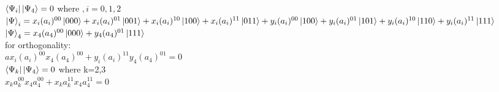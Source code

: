\documentclass[a4paper,12pt]{article}
\begin{document}
\leavevmode\\
\newline \\
$\bra{\Psi_{i}}\ket{\Psi_{4}}=0 $       where     $ ,i=0,1,2   $ 
\leavevmode
\newline  \\
$\ket{\Psi}_{i}=x_{i}(a_{i})^{00}\ket{000}+x_{i}(a_{i})^{01}\ket{001}+x_{i}(a_{i})^{10}\ket{100}+x_{i}(a_{i})^{11}\ket{011}+y_{i}(a_{i})^{00}\ket{100}+y_{i}(a_{i})^{01}\ket{101}+y_{i}(a_{i})^{10}\ket{110}+y_{i}(a_{i})^{11}\ket{111}$
\leavevmode
\newline \\
$\ket{\Psi}_{4}=x_{4}(a_{4})^{00}\ket{000}+y_{4}(a_{4})^{01}\ket{111}$
\newline \\
for orthogonality:
\newline \\
$a x_{i}(a_{i})^{00}x_{4}(a_{4})^{00}+y_{i}(a_{i})^{11}y_{4}(a_{4})^{01}=0$
\newline \\
$\bra{\Psi_{k}}\ket{\Psi_{4}}=0 $  where k=2,3
\newline \\
$x_{k}a_{k}^{00}x_{4}a_{4}^{00}+x_{k}a_{k}^{11}x_{4}a_{4}^{11}=0$
\end{document}
